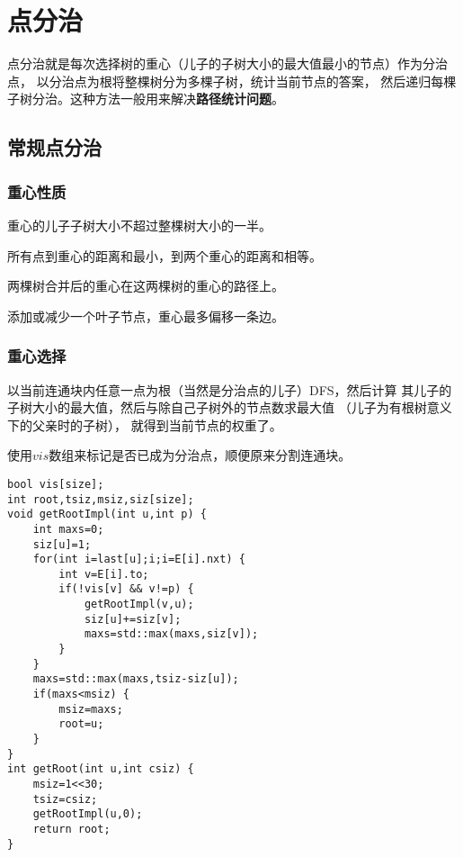 \section{点分治}
点分治就是每次选择树的重心（儿子的子树大小的最大值最小的节点）作为分治点，
以分治点为根将整棵树分为多棵子树，统计当前节点的答案，
然后递归每棵子树分治。这种方法一般用来解决{\bfseries 路径统计问题}。
\subsection{常规点分治}
\subsubsection{重心性质}
\begin{property}\label{WPP}
    重心的儿子子树大小不超过整棵树大小的一半。
\end{property}
\begin{property}
    所有点到重心的距离和最小，到两个重心的距离和相等。
\end{property}
\begin{property}
    两棵树合并后的重心在这两棵树的重心的路径上。
\end{property}
\begin{property}
    添加或减少一个叶子节点，重心最多偏移一条边。
\end{property}
\subsubsection{重心选择}
以当前连通块内任意一点为根（当然是分治点的儿子）DFS，然后计算
其儿子的子树大小的最大值，然后与除自己子树外的节点数求最大值
（儿子为有根树意义下的父亲时的子树），
就得到当前节点的权重了。

使用$vis$数组来标记是否已成为分治点，顺便原来分割连通块。

\begin{lstlisting}[title=getRoot]
bool vis[size];
int root,tsiz,msiz,siz[size];
void getRootImpl(int u,int p) {
    int maxs=0;
    siz[u]=1;
    for(int i=last[u];i;i=E[i].nxt) {
        int v=E[i].to;
        if(!vis[v] && v!=p) {
            getRootImpl(v,u);
            siz[u]+=siz[v];
            maxs=std::max(maxs,siz[v]);
        }
    }
    maxs=std::max(maxs,tsiz-siz[u]);
    if(maxs<msiz) {
        msiz=maxs;
        root=u;
    }
}
int getRoot(int u,int csiz) {
    msiz=1<<30;
    tsiz=csiz;
    getRootImpl(u,0);
    return root;
}
\end{lstlisting}

